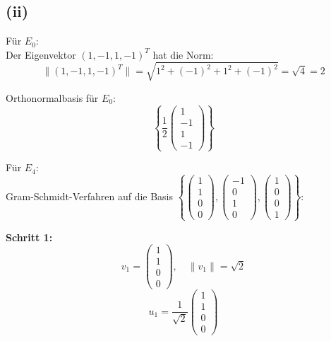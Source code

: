 \documentclass{article}
\begin{document}
\subsection*{(ii)}

Für $E_0$: \\
Der Eigenvektor $(1, -1, 1, -1)^T$ hat die Norm:
$$\|(1, -1, 1, -1)^T\| = \sqrt{1^2 + (-1)^2 + 1^2 + (-1)^2} = \sqrt{4} = 2$$

Orthonormalbasis für $E_0$: 
$$\left\{\frac{1}{2}\begin{pmatrix} 1 \\ -1 \\ 1 \\ -1 \end{pmatrix}\right\}$$

Für $E_4$: \\

Gram-Schmidt-Verfahren auf die Basis $\left\{\begin{pmatrix} 1 \\ 1 \\ 0 \\ 0 \end{pmatrix}, \begin{pmatrix} -1 \\ 0 \\ 1 \\ 0 \end{pmatrix}, \begin{pmatrix} 1 \\ 0 \\ 0 \\ 1 \end{pmatrix}\right\}$:

\textbf{Schritt 1:}
$$v_1 = \begin{pmatrix} 1 \\ 1 \\ 0 \\ 0 \end{pmatrix}, \quad \|v_1\| = \sqrt{2}$$
$$u_1 = \frac{1}{\sqrt{2}}\begin{pmatrix} 1 \\ 1 \\ 0 \\ 0 \end{pmatrix}$$
\end{document}
